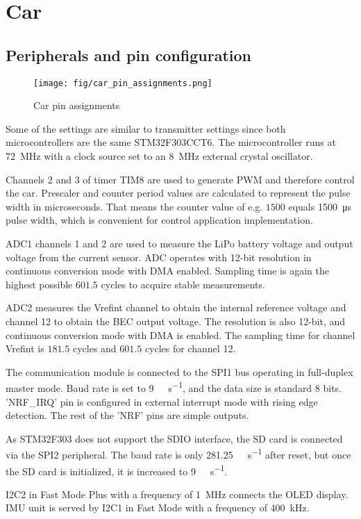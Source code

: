 \section{Car}
\subsection{Peripherals and pin configuration}
\label{sub:car_conf}
\begin{figure}[t]
\centering
\texttt{[image: fig/car\_pin\_assignments.png]}
\caption{Car pin assignments}
\label{fig:car_conf}
\end{figure}
Some of the settings are similar to transmitter settings since both microcontrollers are the same STM32F303CCT6. The microcontroller runs at \SI{72}{\MHz} with a clock source set to an \SI{8}{\MHz} external crystal oscillator.

Channels 2 and 3 of timer TIM8 are used to generate PWM and therefore control the car. Prescaler and counter period values are calculated to represent the pulse width in microseconds. That means the counter value of e.g. $1500$ equals \SI{1500}{\micro\second} pulse width, which is convenient for control application implementation.

ADC1 channels 1 and 2 are used to measure the LiPo battery voltage and output voltage from the current sensor. ADC operates with 12-bit resolution in continuous conversion mode with DMA enabled. Sampling time is again the highest possible $601.5$ cycles to acquire stable measurements.

ADC2 measures the Vrefint channel to obtain the internal reference voltage and channel 12 to obtain the BEC output voltage. The resolution is also 12-bit, and continuous conversion mode with DMA is enabled. The sampling time for channel Vrefint is $181.5$ cycles and $601.5$ cycles for channel 12.

The communication module is connected to the SPI1 bus operating in full-duplex master mode. Baud rate is set to \SI{9}{\mega\bit\per\second}, and the data size is standard 8 bits. 'NRF\_IRQ' pin is configured in external interrupt mode with rising edge detection. The rest of the 'NRF' pins are simple outputs.

As STM32F303 does not support the SDIO interface, the SD card is connected via the SPI2 peripheral. The baud rate is only \SI{281.25}{\kilo\bit\per\second} after reset, but once the SD card is initialized, it is increased to \SI{9}{\mega\bit\per\second}.

I2C2 in Fast Mode Plus with a frequency of \SI{1}{\MHz} connects the OLED display. IMU unit is served by I2C1 in Fast Mode with a frequency of \SI{400}{\kHz}.

